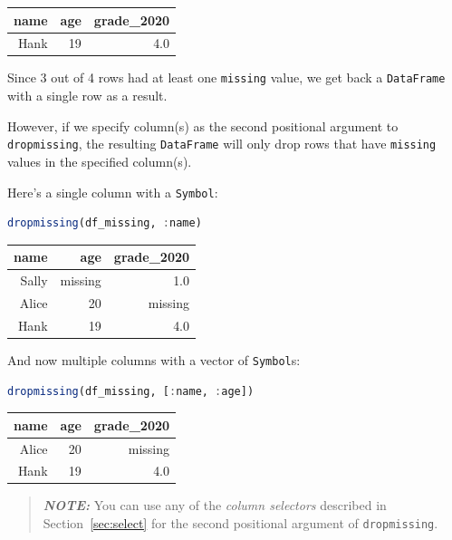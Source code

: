 \documentclass[
  notoc %
]{tufte-book}
\newcommand{\passthrough}[1]{#1}
\begin{document}
\begin{longtable}[]{@{}rrr@{}}
\toprule()
name & age & grade\_2020 \\
\midrule()
\endhead
Hank & 19 & 4.0 \\
\bottomrule()
\end{longtable}

Since 3 out of 4 rows had at least one \passthrough{\lstinline!missing!}
value, we get back a \passthrough{\lstinline!DataFrame!} with a single
row as a result.

However, if we specify column(s) as the second positional argument to
\passthrough{\lstinline!dropmissing!}, the resulting
\passthrough{\lstinline!DataFrame!} will only drop rows that have
\passthrough{\lstinline!missing!} values in the specified column(s).

Here's a single column with a \passthrough{\lstinline!Symbol!}:

\begin{lstlisting}[language=Julia]
dropmissing(df_missing, :name)
\end{lstlisting}

\begin{longtable}[]{@{}rrr@{}}
\toprule()
name & age & grade\_2020 \\
\midrule()
\endhead
Sally & missing & 1.0 \\
Alice & 20 & missing \\
Hank & 19 & 4.0 \\
\bottomrule()
\end{longtable}

And now multiple columns with a vector of
\passthrough{\lstinline!Symbol!}s:

\begin{lstlisting}[language=Julia]
dropmissing(df_missing, [:name, :age])
\end{lstlisting}

\begin{longtable}[]{@{}rrr@{}}
\toprule()
name & age & grade\_2020 \\
\midrule()
\endhead
Alice & 20 & missing \\
Hank & 19 & 4.0 \\
\bottomrule()
\end{longtable}

\begin{quote}
\textbf{\emph{NOTE:}} You can use any of the \emph{column selectors}
described in Section~\ref{sec:select} for the second positional argument
of \passthrough{\lstinline!dropmissing!}.
\end{quote}
\end{document}

